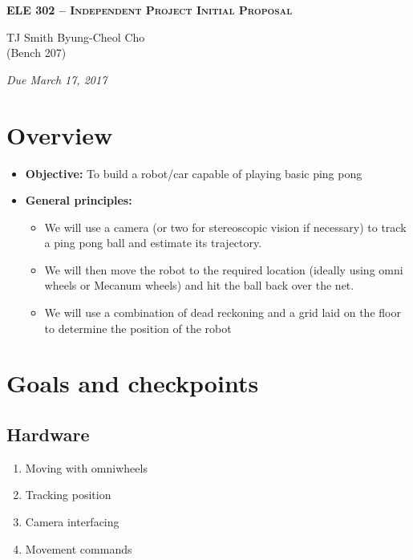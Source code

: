 \documentclass[letterpaper, 11pt]{article}
\begin{document}
    \begin{center}
        \large
        \textsc{\textbf{ELE 302 -- Independent Project Initial Proposal}} \vspace{5pt}

        \normalsize
        TJ Smith \hspace{1cm} Byung-Cheol Cho \\
        (Bench 207) \vspace{5pt}

        \emph{Due March 17, 2017}
        \normalsize
    \end{center}

\section{Overview}
\begin{itemize}
    \item \textbf{Objective:} To build a robot/car capable of playing basic ping pong
    \item \textbf{General principles:}
        \begin{itemize}
            \item We will use a camera (or two for stereoscopic vision if necessary) to track a ping pong ball and estimate its trajectory.
            \item We will then move the robot to the required location (ideally using omni wheels or Mecanum wheels) and hit the ball back over the net.
            \item We will use a combination of dead reckoning and a grid laid on the floor to determine the position of the robot
        \end{itemize}
\end{itemize}

\section{Goals and checkpoints}
\subsection*{Hardware}
\begin{enumerate}[label=\textbf{(\arabic*)}]
    \item Moving with omniwheels
    \item Tracking position
    \item Camera interfacing
    \item Movement commands
\end{enumerate}
\end{document}
